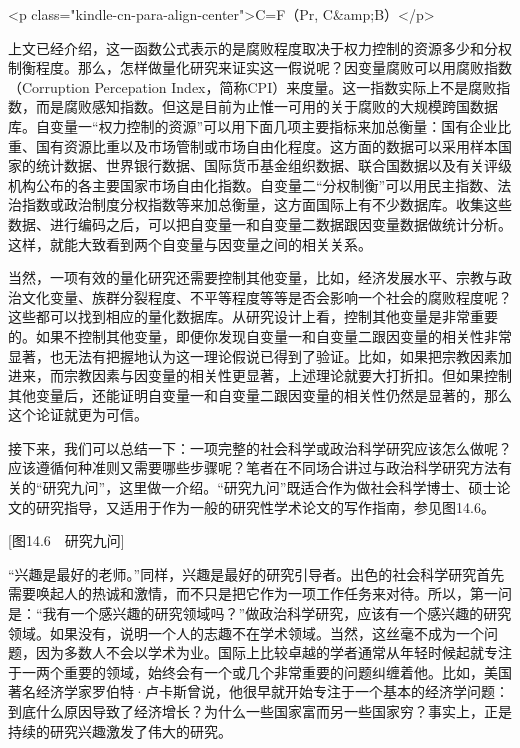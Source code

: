 <p class="kindle-cn-para-align-center">C=F（Pr, C&amp;B）</p>

上文已经介绍，这一函数公式表示的是腐败程度取决于权力控制的资源多少和分权制衡程度。那么，怎样做量化研究来证实这一假说呢？因变量腐败可以用腐败指数（Corruption Percepation Index，简称CPI）来度量。这一指数实际上不是腐败指数，而是腐败感知指数。但这是目前为止惟一可用的关于腐败的大规模跨国数据库。自变量一“权力控制的资源”可以用下面几项主要指标来加总衡量：国有企业比重、国有资源比重以及市场管制或市场自由化程度。这方面的数据可以采用样本国家的统计数据、世界银行数据、国际货币基金组织数据、联合国数据以及有关评级机构公布的各主要国家市场自由化指数。自变量二“分权制衡”可以用民主指数、法治指数或政治制度分权指数等来加总衡量，这方面国际上有不少数据库。收集这些数据、进行编码之后，可以把自变量一和自变量二数据跟因变量数据做统计分析。这样，就能大致看到两个自变量与因变量之间的相关关系。

当然，一项有效的量化研究还需要控制其他变量，比如，经济发展水平、宗教与政治文化变量、族群分裂程度、不平等程度等等是否会影响一个社会的腐败程度呢？这些都可以找到相应的量化数据库。从研究设计上看，控制其他变量是非常重要的。如果不控制其他变量，即便你发现自变量一和自变量二跟因变量的相关性非常显著，也无法有把握地认为这一理论假说已得到了验证。比如，如果把宗教因素加进来，而宗教因素与因变量的相关性更显著，上述理论就要大打折扣。但如果控制其他变量后，还能证明自变量一和自变量二跟因变量的相关性仍然是显著的，那么这个论证就更为可信。


接下来，我们可以总结一下：一项完整的社会科学或政治科学研究应该怎么做呢？应该遵循何种准则又需要哪些步骤呢？笔者在不同场合讲过与政治科学研究方法有关的“研究九问”，这里做一介绍。“研究九问”既适合作为做社会科学博士、硕士论文的研究指导，又适用于作为一般的研究性学术论文的写作指南，参见图14.6。

[图14.6　研究九问]

“兴趣是最好的老师。”同样，兴趣是最好的研究引导者。出色的社会科学研究首先需要唤起人的热诚和激情，而不只是把它作为一项工作任务来对待。所以，第一问是：“我有一个感兴趣的研究领域吗？”做政治科学研究，应该有一个感兴趣的研究领域。如果没有，说明一个人的志趣不在学术领域。当然，这丝毫不成为一个问题，因为多数人不会以学术为业。国际上比较卓越的学者通常从年轻时候起就专注于一两个重要的领域，始终会有一个或几个非常重要的问题纠缠着他。比如，美国著名经济学家罗伯特·卢卡斯曾说，他很早就开始专注于一个基本的经济学问题：到底什么原因导致了经济增长？为什么一些国家富而另一些国家穷？事实上，正是持续的研究兴趣激发了伟大的研究。

